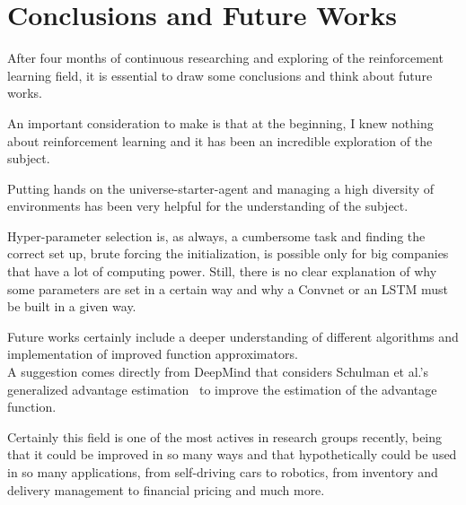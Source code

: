 \chapter{Conclusions and Future Works}
\label{chapter5}

\vspace{0.5cm}

\noindent After four months of continuous researching and exploring of the reinforcement learning field, it is essential to draw some conclusions and think about future works.

An important consideration to make is that at the beginning, I knew nothing about reinforcement learning and it has been an incredible exploration of the subject.

Putting hands on the universe-starter-agent and managing a high diversity of environments has been very helpful for the understanding of the subject. 

Hyper-parameter selection is, as always, a cumbersome task and finding the correct set up, brute forcing the initialization, is possible only for big companies that have a lot of computing power. Still, there is no clear explanation of why some parameters are set in a certain way and why a Convnet or an LSTM must be built in a given way. 

Future works certainly include a deeper understanding of different algorithms and implementation of improved function approximators. \\
A suggestion comes directly from DeepMind that considers Schulman et al.'s generalized advantage estimation~\cite{schulman2015} to improve the estimation of the advantage function.

Certainly this field is one of the most actives in research groups recently, being that it could be improved in so many ways and that hypothetically could be used in so many applications, from self-driving cars to robotics, from inventory and delivery management to financial pricing and much more.